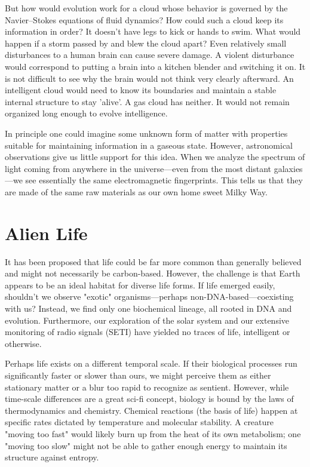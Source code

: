 But how would evolution work for a cloud whose behavior is governed
by the Navier--Stokes equations of fluid dynamics? How could such a
cloud keep its information in order? It doesn't have legs to kick or
hands to swim. What would happen if a storm
passed by and blew the cloud apart? Even relatively small disturbances to a human brain can cause severe
damage. A violent disturbance would correspond to putting a brain into
a kitchen blender and switching it on. It is not difficult to see why
the brain would not think very clearly afterward.
An intelligent cloud would need to know its boundaries and maintain
a stable internal structure to stay 'alive'. A gas cloud has neither. It would not
remain organized long enough to evolve intelligence.

In principle one could imagine some unknown form of matter with
properties suitable for maintaining information in a gaseous state.
However, astronomical observations give us little support for this
idea. When we analyze the spectrum of light coming from anywhere in
the universe—even from the most distant galaxies—we see essentially
the same electromagnetic fingerprints. This tells us that they are
made of the same raw materials as our own home sweet Milky Way.



\section*{Alien Life}

It has been proposed that life could be far more common than generally believed and might not necessarily be carbon-based.
However, the challenge is that Earth appears to be an ideal habitat for diverse life forms.
If life emerged easily, shouldn't we observe "exotic" organisms—perhaps non-DNA-based—coexisting with us?
Instead, we find only one biochemical lineage, all rooted in DNA and evolution.
Furthermore, our exploration of the solar system and our extensive monitoring of radio signals (SETI) have yielded no traces of life, intelligent or otherwise.

Perhaps life exists on a different temporal scale. If their biological processes run significantly faster or slower than ours,
we might perceive them as either stationary matter or a blur too rapid to recognize as sentient.
However, while time-scale differences are a great sci-fi concept, biology is bound by the laws of thermodynamics and chemistry.
Chemical reactions (the basis of life) happen at specific rates dictated by temperature and molecular stability.
A creature "moving too fast" would likely burn up from the heat of its own metabolism; one "moving too slow" might not be able to gather
enough energy to maintain its structure against entropy.

